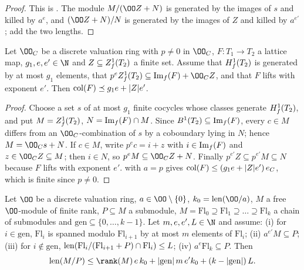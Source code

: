 \begin{proof}
This is .
The module $M/(\OO Z+N)$ is generated by the images of $s$ and killed by $a^e$, and $(\OO Z+N)/N$ is generated by
the images of $Z$ and killed by $a^{e'}$; add the two lengths.
\end{proof}

\begin{lemma}\label{pf:linkN-adm:colexp}
Let $\OO_C$ be a discrete valuation ring with $p\ne0$ in $\OO_C$, $F\colon T_1\to T_2$ a lattice map, $g_1,e,e'\in\N$
and $Z\subseteq Z^1_{f}(T_2)$ a finite set. Assume that $H^1_{f}(T_2)$ is generated by at most $g_1$
elements, that $p^e\linkNadmZf(T_2)\subseteq\linkNadmIm(F)+\OO_CZ$, and that $F$
lifts with exponent $e'$. Then $\operatorname{col}(F)\preceq g_1e+|Z|e'$.
\end{lemma}

\begin{proof}
Choose a set $s$ of at most $g_1$ finite cocycles whose classes generate $H^1_{f}(T_2)$, and put
$M=Z^1_{f}(T_2)$, $N=\operatorname{Im}_f(F)\cap M$. Since $B^1(T_2)\subseteq\operatorname{Im}_f(F)$, every $c\in M$ differs
from an $\OO_C$-combination of $s$ by a coboundary lying in $N$; hence $M=\OO_Cs+N$. If $c\in M$, write
$p^ec=i+z$ with $i\in\operatorname{Im}_f(F)$ and $z\in\OO_CZ\subseteq M$; then $i\in N$, so $p^eM\subseteq\OO_CZ+N$.
Finally $p^{e'}Z\subseteq p^{e'}M\subseteq N$ because $F$ lifts with exponent $e'$. 
with $a=p$ gives $\operatorname{col}(F)\le(g_1e+|Z|e')\,e_C$, which is finite since $p\ne0$.
\end{proof}

\begin{lemma}\label{pf:linkN-adm:filtration}
Let $\OO$ be a discrete valuation ring, $a\in\OO\setminus\{0\}$, $k_0=\linkNadmlen(\OO/a)$, $M$ a free $\OO$-module of
finite rank, $P\subseteq M$ a submodule, $M=\mathrm{Fl}_0\supseteq\mathrm{Fl}_1\supseteq\dots\supseteq\mathrm{Fl}_k$ a
chain of submodules and $\mathrm{gen}\subseteq\{0,\dots,k-1\}$. Let $m,e,e',L\in\N$ and assume:
(i) for $i\in\mathrm{gen}$, $\mathrm{Fl}_i$ is spanned modulo $\mathrm{Fl}_{i+1}$ by at most $m$ elements of
$\mathrm{Fl}_i$; (ii) $a^{e'}M\subseteq P$; (iii) for $i\notin\mathrm{gen}$,
$\operatorname{len}(\mathrm{Fl}_i/(\mathrm{Fl}_{i+1}+P)\cap\mathrm{Fl}_i)\le L$; (iv) $a^e\mathrm{Fl}_k\subseteq P$. Then
\[
\linkNadmlen(M/P)\le \rank(M)\,e\,k_0+|\mathrm{gen}|\,m\,e'k_0+(k-|\mathrm{gen}|)\,L .
\]
\end{lemma}

